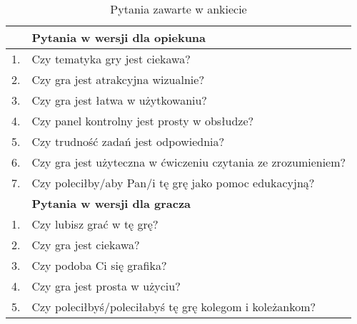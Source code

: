         \begin{table}
            \begin{tabularx}{\textwidth}{ l X }
             \hline
             
             \hline
                & \textbf{Pytania w wersji dla opiekuna} \\
             \hline
             1. & Czy tematyka gry jest ciekawa? \\
             2. & Czy gra jest atrakcyjna wizualnie? \\
             3. & Czy gra jest łatwa w użytkowaniu? \\
             4. & Czy panel kontrolny jest prosty w obsłudze? \\
             5. & Czy trudność zadań jest odpowiednia? \\
             6. & Czy gra jest użyteczna w ćwiczeniu czytania ze zrozumieniem? \\
             7. & Czy poleciłby/aby Pan/i tę grę jako pomoc edukacyjną? \\
             \hline
             
             \hline
                & \textbf{Pytania w wersji dla gracza} \\
             \hline
                1. & Czy lubisz grać w tę grę? \\
                2. & Czy gra jest ciekawa? \\
                3. & Czy podoba Ci się grafika? \\
                4. & Czy gra jest prosta w użyciu? \\
                5. & Czy poleciłbyś/poleciłabyś tę grę kolegom i koleżankom? \\
             \hline
             
             \hline
            \end{tabularx}
            \caption{Pytania zawarte w ankiecie}
            \label{table:ankieta}
        \end{table}


